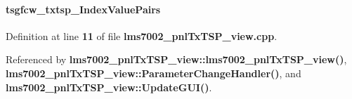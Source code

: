 \paragraph[{tsgfcw\+\_\+txtsp\+\_\+\+Index\+Value\+Pairs}]{ tsgfcw\+\_\+txtsp\+\_\+\+Index\+Value\+Pairs}\label{lms7002__pnlTxTSP__view_8cpp_a31ce57b59e6c3c0818bd48d388d4b1d4}


Definition at line {\bf 11} of file {\bf lms7002\+\_\+pnl\+Tx\+T\+S\+P\+\_\+view.\+cpp}.



Referenced by {\bf lms7002\+\_\+pnl\+Tx\+T\+S\+P\+\_\+view\+::lms7002\+\_\+pnl\+Tx\+T\+S\+P\+\_\+view()}, {\bf lms7002\+\_\+pnl\+Tx\+T\+S\+P\+\_\+view\+::\+Parameter\+Change\+Handler()}, and {\bf lms7002\+\_\+pnl\+Tx\+T\+S\+P\+\_\+view\+::\+Update\+G\+U\+I()}.

